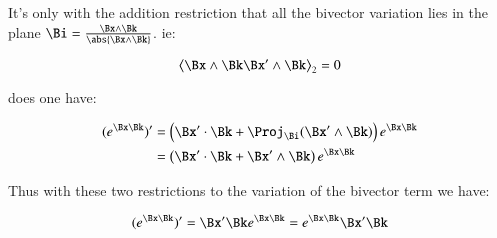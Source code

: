 It's only with the addition restriction that all the bivector variation lies in the plane $\Bi = \frac{\Bx \wedge \Bk }{ \abs{\Bx \wedge \Bk} }$.  ie:

\[
\gpgradetwo{\Bx \wedge \Bk \Bx' \wedge \Bk} = 0
\]

does one have:

\begin{align*}
(e^{\Bx\Bk})' 
&= \left(\Bx' \cdot \Bk + \Proj_{\Bi}(\Bx' \wedge \Bk) \right) e^{\Bx\Bk} \\
&= \left(\Bx' \cdot \Bk + \Bx' \wedge \Bk \right) e^{\Bx\Bk} \\
\end{align*}

Thus with these two restrictions to the variation of the bivector term we have:

\begin{equation}
(e^{\Bx\Bk})' = \Bx'\Bk e^{\Bx\Bk} = e^{\Bx\Bk} \Bx'\Bk 
\end{equation}
